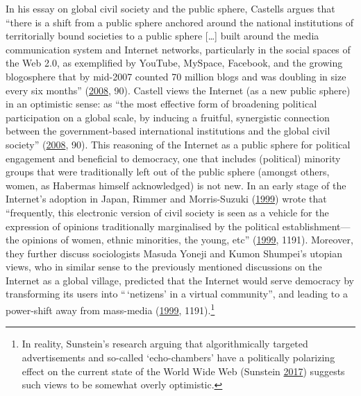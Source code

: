 \documentclass[10pt,british,A4paper,twoside]{memoir}
\begin{document}
In his essay on global civil society and the public sphere, Castells
argues that ``there is a shift from a public sphere anchored around the
national institutions of territorially bound societies to a public
sphere {[}\ldots{}{]} built around the media communication system and
Internet networks, particularly in the social spaces of the Web 2.0, as
exemplified by YouTube, MySpace, Facebook, and the growing blogosphere
that by mid-2007 counted 70 million blogs and was doubling in size every
six months'' (\protect\hyperlink{ref-castells_new_2008}{2008}, 90).
Castell views the Internet (as a new public sphere) in an optimistic
sense: as ``the most effective form of broadening political
participation on a global scale, by inducing a fruitful, synergistic
connection between the government-based international institutions and
the global civil society''
(\protect\hyperlink{ref-castells_new_2008}{2008}, 90). This reasoning of
the Internet as a public sphere for political engagement and beneficial
to democracy, one that includes (political) minority groups that were
traditionally left out of the public sphere (amongst others, women, as
Habermas himself acknowledged) is not new. In an early stage of the
Internet's adoption in Japan, Rimmer and Morris-Suzuki
(\protect\hyperlink{ref-rimmer_japanese_1999}{1999}) wrote that
``frequently, this electronic version of civil society is seen as a
vehicle for the expression of opinions traditionally marginalised by the
political establishment---the opinions of women, ethnic minorities, the
young, etc'' (\protect\hyperlink{ref-rimmer_japanese_1999}{1999}, 1191).
Moreover, they further discuss sociologists Masuda Yoneji and Kumon
Shumpei's utopian views, who in similar sense to the previously mentioned discussions on the Internet as a global village, predicted that the Internet would serve
democracy by transforming its users into ``\,`netizens' in a virtual
community'', and leading to a power-shift away from mass-media
(\protect\hyperlink{ref-rimmer_japanese_1999}{1999}, 1191).\footnote{In
  reality, Sunstein's research arguing that algorithmically targeted
  advertisements and so-called `echo-chambers' have a politically
  polarizing effect on the current state of the World Wide Web (Sunstein
  \protect\hyperlink{ref-sunstein_republic:_2017}{2017}) suggests such
  views to be somewhat overly optimistic.}
\end{document}
